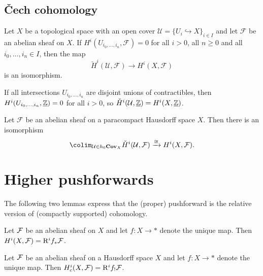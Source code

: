 \subsection{Čech cohomology}

\begin{prop}[name={\cref{cor:Čech-cohomology-vanishing-intersections}}]
Let \(X\) be a topological space with an open cover \(\mathcal U=\{U_i\hookrightarrow X\}_{i\in I}\) and let \(\mathcal F\) be an abelian sheaf on \(X\).
If \(H^i(U_{i_0,\ldots,i_n},\mathcal F)=0\) for all \(i>0\), all \(n\geq 0\) and all \(i_0,\ldots,i_n\in I\), then the map
\[ \check{H}^i(\mathcal U,\mathcal F) \to H^i(X,\mathcal F) \]
is an isomorphism.
\end{prop}

\begin{cor}[name={\cref{exmp:Čech-cohomology-intersections-disjoint-unions-of-contractibles}}]
If all intersections \(U_{i_0,\ldots,i_n}\) are disjoint unions of contractibles, then \(H^i(U_{i_0,\ldots,i_n},\underline{\mathbb{Z}})=0\) for all \(i>0\), so \(\check{H}^i(\mathcal U,\underline{\mathbb{Z}})=H^i(X,\underline{\mathbb{Z}})\).
\end{cor}

\begin{prop}[name={\cref{thm:Čech-cohomology-paracompact-Hausdorff-space}}]
Let \(\mathcal F\) be an abelian sheaf on a paracompact Hausdorff space \(X\).
Then there is an isomorphism
\[ \colim_{\mathcal U\in h_0\catOpenCover{X}}\check{H}^i(\mathcal U,\mathcal F) \xrightarrow{\cong} H^i(X,\mathcal F)\text{.} \]
\end{prop}

\section{Higher pushforwards}

The following two lemmas express that the (proper) pushforward is the relative version of (compactly supported) cohomology.

\begin{lem}[name={\cref{exc:cohomology-higher-pushforward-to-point}}]
Let \(\mathcal{F}\) be an abelian sheaf on \(X\) and let \(f\colon X\to *\) denote the unique map.
Then \(\cohomology^i(X,\sh F) = \rightderived^i f_*\sh F\).
\end{lem}

\begin{lem}[name={\cref{exc:compactly-supported-cohomology-higher-proper-pushforward-to-point}}]
Let \(\mathcal{F}\) be an abelian sheaf on a Hausdorff space \(X\) and let \(f\colon X\to *\) denote the unique map.
Then \(\cohomology^i_c(X,\sh F) = \rightderived^i f_!\sh F\).
\end{lem}


